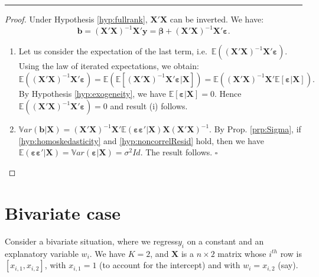 \documentclass[
]{book}
\providecommand{\tightlist}{%
  \setlength{\itemsep}{0pt}\setlength{\parskip}{0pt}}
\theoremstyle{definition}
\theoremstyle{definition}
\theoremstyle{definition}
\theoremstyle{definition}
\theoremstyle{remark}
\begin{document}
\begin{center}\rule{0.5\linewidth}{0.5pt}\end{center}

\begin{proof}

Under Hypothesis \ref{hyp:fullrank}, \(\mathbf{X}'\mathbf{X}\) can be inverted. We have:
\[
\mathbf{b} = (\mathbf{X}'\mathbf{X})^{-1} \mathbf{X}'\mathbf{y} = \boldsymbol\beta + (\mathbf{X}'\mathbf{X})^{-1} \mathbf{X}' \mathbf{\varepsilon}.
\]

\begin{enumerate}
\def\labelenumi{\roman{enumi}.}
\tightlist
\item
  Let us consider the expectation of the last term, i.e.~\(\mathbb{E}((\mathbf{X}'\mathbf{X})^{-1} \mathbf{X}' \mathbf{\varepsilon})\). Using the law of iterated expectations, we obtain:
  \[
  \mathbb{E}((\mathbf{X}'\mathbf{X})^{-1} \mathbf{X}' \mathbf{\varepsilon}) = \mathbb{E}(\mathbb{E}[(\mathbf{X}'\mathbf{X})^{-1} \mathbf{X}' \mathbf{\varepsilon}|\mathbf{X}]) = \mathbb{E}((\mathbf{X}'\mathbf{X})^{-1} \mathbf{X}'\mathbb{E}[\mathbf{\varepsilon}|\mathbf{X}]).
  \]
  By Hypothesis \ref{hyp:exogeneity}, we have \(\mathbb{E}[\mathbf{\varepsilon}|\mathbf{X}]=0\). Hence \(\mathbb{E}((\mathbf{X}'\mathbf{X})^{-1} \mathbf{X}' \mathbf{\varepsilon}) =0\) and result (i) follows.
\item
  \(\mathbb{V}ar(\mathbf{b}|\mathbf{X}) = (\mathbf{X}'\mathbf{X})^{-1} \mathbf{X}' \mathbb{E}(\boldsymbol\varepsilon\boldsymbol\varepsilon'|\mathbf{X}) \mathbf{X} (\mathbf{X}'\mathbf{X})^{-1}\).
  By Prop. \ref{prp:Sigma}, if \ref{hyp:homoskedasticity} and \ref{hyp:noncorrelResid} hold, then we have \(\mathbb{E}(\boldsymbol\varepsilon\boldsymbol\varepsilon'|\mathbf{X})=\mathbb{V}ar(\boldsymbol\varepsilon|\mathbf{X})=\sigma^2 Id\). The result follows. \(\square\)
\end{enumerate}

\end{proof}

\hypertarget{bivariate-case}{%
\section{Bivariate case}\label{bivariate-case}}

Consider a bivariate situation, where we regress\(y_i\) on a constant and an explanatory variable \(w_i\). We have \(K=2\), and \(\mathbf{X}\) is a \(n \times 2\) matrix whose \(i^{th}\) row is \([x_{i,1},x_{i,2}]\), with \(x_{i,1}=1\) (to account for the intercept) and with \(w_i = x_{i,2}\) (say).
\end{document}

